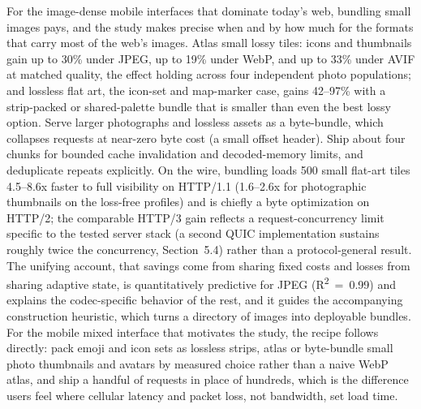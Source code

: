 \documentclass[3p,twocolumn]{elsarticle}
\begin{document}
For the image-dense mobile interfaces that dominate
today's web, bundling small images pays, and the study
makes precise when and by how much for the formats that carry most of
the web's images. Atlas small lossy tiles: icons and
thumbnails gain up to 30\% under JPEG, up to 19\% under WebP, and up to
33\% under AVIF at matched quality, the effect holding across four
independent photo populations; and lossless flat art, the icon-set and
map-marker case, gains 42--97\% with a strip-packed or shared-palette
bundle that is smaller than even the best lossy option. Serve larger
photographs and lossless assets as a byte-bundle, which collapses
requests at near-zero byte cost (a small offset header). Ship about four
chunks for bounded cache invalidation and decoded-memory limits, and
deduplicate repeats explicitly. On the wire, bundling loads 500 small
flat-art tiles 4.5--8.6x faster to full visibility on HTTP/1.1
(1.6--2.6x for photographic thumbnails on the loss-free profiles) and is
chiefly a byte optimization on HTTP/2; the comparable HTTP/3 gain
reflects a request-concurrency limit specific to the tested server stack
(a second QUIC implementation sustains roughly twice the concurrency,
Section~5.4) rather than a protocol-general result. The unifying
account, that savings come from sharing fixed costs and losses from
sharing adaptive state, is quantitatively predictive for JPEG
(R\textsuperscript{2}~=~0.99) and explains the codec-specific behavior
of the rest, and it guides the accompanying construction heuristic,
which turns a directory of images into deployable bundles. For the
mobile mixed interface that motivates the study, the recipe follows
directly: pack emoji and icon sets as lossless strips, atlas or
byte-bundle small photo thumbnails and avatars by measured choice rather
than a naive WebP atlas, and ship a handful of requests in place of
hundreds, which is the difference users feel where cellular latency and
packet loss, not bandwidth, set load time.
\end{document}

